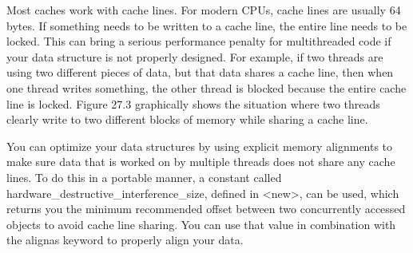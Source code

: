 
Most caches work with cache lines. For modern CPUs, cache lines are usually 64 bytes. If something needs to be written to a cache line, the entire line needs to be locked. This can bring a serious performance penalty for multithreaded code if your data structure is not properly designed. For example, if two threads are using two different pieces of data, but that data shares a cache line, then when one thread writes something, the other thread is blocked because the entire cache line is locked. Figure 27.3 graphically shows the situation where two threads clearly write to two different blocks of memory while sharing a cache line.


You can optimize your data structures by using explicit memory alignments to make sure data that is worked on by multiple threads does not share any cache lines. To do this in a portable manner, a constant called hardware\_destructive\_interference\_size, defined in <new>, can be used, which returns you the minimum recommended offset between two concurrently accessed objects to avoid cache line sharing. You can use that value in combination with the alignas keyword to properly align your data.







